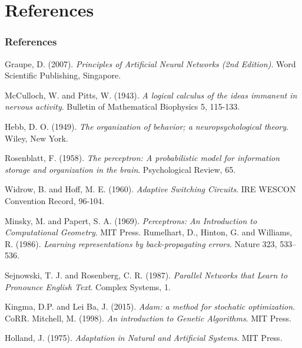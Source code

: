 \documentclass{beamer}
\begin{document}
\section*{References}
\begin{frame}
\frametitle{References}
\begin{thebibliography}{99}
 {\sc Graupe, D.} (2007). \textit{Principles of Artificial Neural Networks (2nd Edition)}. Word Scientific Publishing, Singapore.
 
 {\sc McCulloch, W.} and {\sc Pitts, W}. (1943). \textit{A logical calculus of the ideas immanent in nervous activity}. Bulletin of Mathematical Biophysics 5, 115-133.

 {\sc Hebb, D. O.} (1949). \textit{The organization of behavior; a neuropsychological theory}. Wiley, New York.

 {\sc Rosenblatt, F.} (1958). \textit{The perceptron: A probabilistic model for information storage and organization in the brain}. Psychological Review, 65.

 {\sc Widrow, B.} and {\sc Hoff, M. E.} (1960). \textit{Adaptive Switching Circuits}. IRE WESCON Convention Record, 96-104.


\end{thebibliography}
\end{frame}
\begin{frame}
\begin{thebibliography}{99}
 {\sc Minsky, M.} and {\sc Papert, S. A.} (1969). \textit{Perceptrons: An Introduction to Computational Geometry}. MIT Press.
 {\sc Rumelhart, D.}, {\sc Hinton, G.} and {\sc Williams, R.} (1986). \textit{Learning representations by back-propagating errors}. Nature 323, 533–536.

 {\sc Sejnowski, T. J.} and {\sc Rosenberg, C. R.} (1987). \textit{Parallel Networks that Learn to Pronounce English Text}. Complex Systems, 1.

 {\sc Kingma, D.P.} and {\sc Lei Ba, J.} (2015). \textit{Adam: a method for stochatic optimization}. CoRR.
 {\sc Mitchell, M.} (1998). \textit{An introduction to Genetic Algorithms}. MIT Press.

 {\sc Holland, J.} (1975). \textit{Adaptation in Natural and Artificial Systems}. MIT Press. 
\end{thebibliography}
\end{frame}
\end{document}
